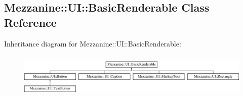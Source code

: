 \hypertarget{classMezzanine_1_1UI_1_1BasicRenderable}{
\subsection{Mezzanine::UI::BasicRenderable Class Reference}
\label{classMezzanine_1_1UI_1_1BasicRenderable}
}
Inheritance diagram for Mezzanine::UI::BasicRenderable:\begin{figure}[H]
\begin{center}
\leavevmode
\includegraphics[height=2.100000cm]{classMezzanine_1_1UI_1_1BasicRenderable}
\end{center}
\end{figure}
